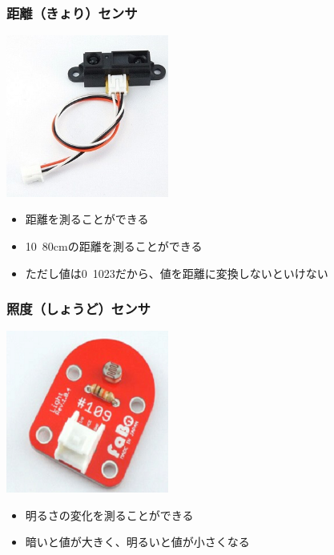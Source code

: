 \begin{frame}
    \frametitle{距離（きょり）センサ}
    \begin{center}
        \includegraphics[width=0.4\textwidth]{images/chap05/text05-img023.jpg}
        \begin{itemize}
            \item 距離を測ることができる
            \item 10~80cmの距離を測ることができる
            \item ただし値は0~1023だから、値を距離に変換しないといけない
        \end{itemize}
    \end{center}
\end{frame}

\begin{frame}
    \frametitle{照度（しょうど）センサ}
    \begin{center}
        \includegraphics[width=0.4\textwidth]{images/chap05/text05-img024.png}
        \begin{itemize}
            \item 明るさの変化を測ることができる
            \item 暗いと値が大きく、明るいと値が小さくなる
        \end{itemize}
    \end{center}
\end{frame}

